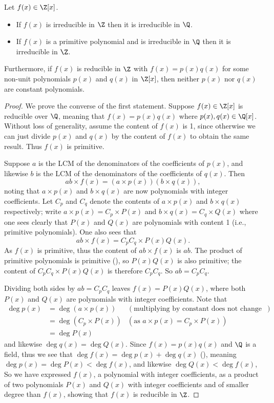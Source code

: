 \begin{theorem}\label{thrm-reducible-over-Q-means-reducible-over-Z}
    Let $f(x) \in \Z[x]$.
    \begin{itemize}
        \item If $f(x)$ is irreducible in $\Z$ then it is irreducible in $\Q$.
        \item If $f(x)$ is a primitive polynomial and is irreducible in $\Q$ then it is irreducible in $\Z$.
    \end{itemize}
    Furthermore, if $f(x)$ is reducible in $\Z$ with $f(x) = p(x)q(x)$ for some non-unit polynomials $p(x)$ and $q(x)$ in $\Z[x]$, then neither $p(x)$ nor $q(x)$ are constant polynomials.
\end{theorem}
\begin{proof}
    We prove the converse of the first statement. Suppose $f(x) \in \Z[x]$ is reducible over $\Q$, meaning that $f(x) = p(x)q(x)$ where $p(x), q(x) \in \Q[x]$. Without loss of generality, assume the content of $f(x)$ is 1, since otherwise we can just divide $p(x)$ and $q(x)$ by the content of $f(x)$ to obtain the same result. Thus $f(x)$ is primitive.

    Suppose $a$ is the LCM of the denominators of the coefficients of $p(x)$, and likewise $b$ is the LCM of the denominators of the coefficients of $q(x)$. Then
    \[
        ab\times f(x) = (a\times p(x))(b\times q(x)),
    \]
    noting that $a\times p(x)$ and $b\times q(x)$ are now polynomials with integer coefficients. Let $C_p$ and $C_q$ denote the contents of $a \times p(x)$ and $b \times q(x)$ respectively; write $a\times p(x) = C_p\times P(x)$ and $b \times q(x) = C_q\times Q(x)$ where one sees clearly that $P(x)$ and $Q(x)$ are polynomials with content 1 (i.e., primitive polynomials). One also sees that
    \[
        ab \times f(x) = C_pC_q \times P(x)Q(x).
    \]
    As $f(x)$ is primitive, thus the content of $ab \times f(x)$ is $ab$. The product of primitive polynomials is primitive (), so $P(x)Q(x)$ is also primitive; the content of $C_pC_q \times P(x)Q(x)$ is therefore $C_pC_q$. So $ab = C_pC_q$.
    
    Dividing both sides by $ab = C_pC_q$ leaves $f(x) = P(x)Q(x)$, where both $P(x)$ and $Q(x)$ are polynomials with integer coefficients. Note that
    \begin{align*}
        \deg p(x) &= \deg (a\times p(x)) & (\text{multiplying by constant does not change degree})\\
        &= \deg(C_p\times P(x)) & (\text{as } a\times p(x) = C_p\times P(x))\\
        &= \deg P(x)
    \end{align*}
    and likewise $\deg q(x) = \deg Q(x)$. Since $f(x) = p(x)q(x)$ and $\Q$ is a field, thus we see that $\deg f(x) = \deg p(x) + \deg q(x)$ (), meaning $\deg p(x) = \deg P(x) < \deg f(x)$, and likewise $\deg Q(x) < \deg f(x)$, So we have expressed $f(x)$, a polynomial with integer coefficients, as a product of two polynomials $P(x)$ and $Q(x)$ with integer coefficients and of smaller degree than $f(x)$, showing that $f(x)$ is reducible in $\Z$.


\end{proof}

